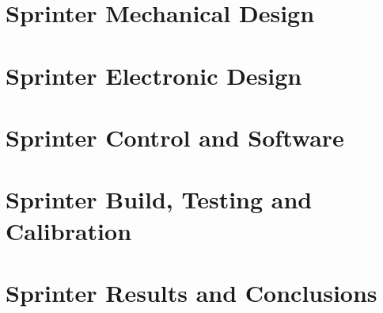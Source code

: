 \section{Sprinter Mechanical Design}
\label{sec:Sprinter Mechanical Design}

\clearpage
\section{Sprinter Electronic Design}
\label{sec:Sprinter Electronic Design}

\clearpage
\section{Sprinter Control and Software}
\label{sec:Sprinter Control and Software}

\clearpage
\section{Sprinter Build, Testing and Calibration}
\label{sec:Sprinter Build, Testing and Calibration}

\clearpage
\section{Sprinter Results and Conclusions}
\label{sec:Sprinter Results and Conclusions}




